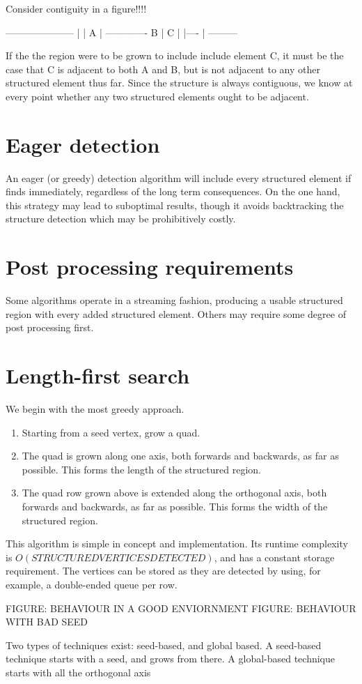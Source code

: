 Consider contiguity in a figure!!!!

---------------------
                    |
                    |
          A         |
        -------------
     B  | C |
        |----
        |
---------

If the the region were to be grown to include include element C, it must be the case that C is adjacent to both A and B, but is not adjacent to any other structured element thus far. Since the structure is always contiguous, we know at every point whether any two structured elements ought to be adjacent.


\section{Eager detection}
An eager (or greedy) detection algorithm will include every structured element if finds immediately, regardless of the long term consequences. On the one hand, this strategy may lead to suboptimal results, though it avoids backtracking the structure detection which may be prohibitively costly.


\section{Post processing requirements}
Some algorithms operate in a streaming fashion, producing a usable structured region with every added structured element. Others may require some degree of post processing first.


\section{Length-first search}
We begin with the most greedy approach.
\begin{enumerate}
\item Starting from a seed vertex, grow a quad.
\item The quad is grown along one axis, both forwards and backwards, as far as possible. This forms the length of the structured region.
\item The quad row grown above is extended along the orthogonal axis, both forwards and backwards, as far as possible. This forms the width of the structured region.
\end{enumerate}

This algorithm is simple in concept and implementation. Its runtime complexity is $O(STRUCTURED VERTICES DETECTED)$, and has a constant storage requirement. The vertices can be stored as they are detected by using, for example, a double-ended queue per row.

FIGURE: BEHAVIOUR IN A GOOD ENVIORNMENT
FIGURE: BEHAVIOUR WITH BAD SEED


Two types of techniques exist: seed-based, and global based. A seed-based technique starts with a seed, and grows from there. A global-based technique starts with all the orthogonal axis